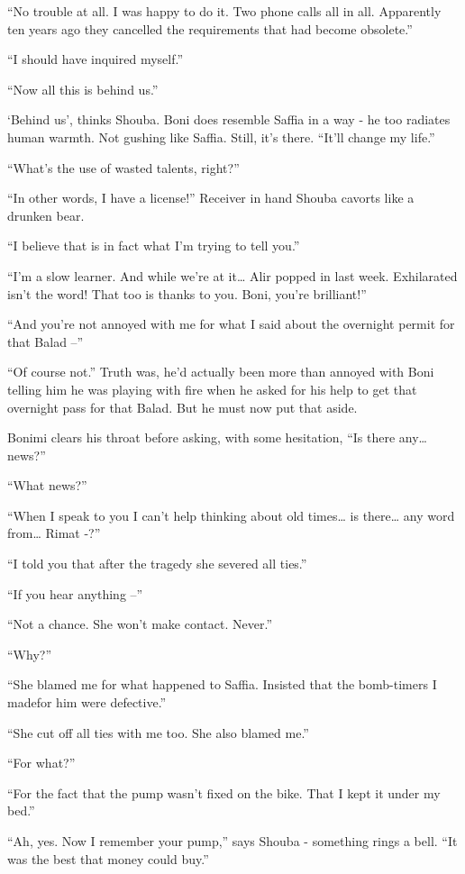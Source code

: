 \documentclass[twoside,11pt]{book}
\begin{document}
``No trouble at all. I was happy to do it. Two phone calls all in all. Apparently ten years ago they
cancelled the requirements that had become obsolete.''

``I should have inquired myself.''

``Now all this is behind us.''

`Behind us', thinks Shouba. Boni does resemble Saffia in a way - he too radiates human warmth. Not gushing like
Saffia. Still, it's there. ``It'll change my life.''

``What's the use of wasted talents, right?''

``In other words, I have a license!'' Receiver in hand Shouba cavorts like a drunken bear.

``I believe that is in fact what I'm trying to tell you.''

``I'm a slow learner. And while we're at it{\dots} Alir popped in last week. Exhilarated isn't the word!
That too is thanks to you. Boni, you're brilliant!''

``And you're not annoyed with me for what I said about the overnight permit for that Balad
--''

``Of course not.'' Truth was, he'd actually been more than annoyed with Boni
telling him he was playing with fire when he asked for his help to get that overnight pass for that
Balad. But he must now put that aside.

Bonimi clears his throat before asking, with some hesitation,
``Is there any{\dots} news?''

``What news?''

``When I speak to you I can't help thinking about old times{\dots} is there{\dots} any word from{\dots}
Rimat -?''

``I told you that after the tragedy she severed all ties.''

``If you hear anything --''

``Not a chance. She won't make contact. Never.''

``Why?''

``She blamed me for what happened to Saffia. Insisted that the bomb-timers I madefor him were
defective.''

``She cut off all ties with me too. She also blamed me.''

``For what?''

``For the fact that the pump wasn't fixed on the bike. That I kept it under my bed.''

``Ah, yes. Now I remember your pump,'' says Shouba - something rings a bell. ``It was the best that money
could buy.''
\end{document}

